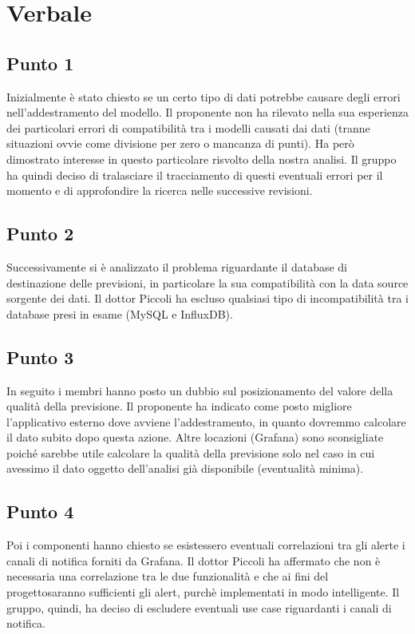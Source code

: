 \section{Verbale}
    \subsection{Punto 1}
        Inizialmente è stato chiesto se un certo tipo di dati potrebbe causare degli errori nell'addestramento del modello. Il proponente non ha rilevato nella sua esperienza dei particolari errori di compatibilità tra i modelli causati dai dati (tranne situazioni ovvie come divisione per zero o mancanza di punti). Ha però dimostrato interesse in questo particolare risvolto della nostra analisi. Il gruppo ha quindi deciso di tralasciare il tracciamento di questi eventuali errori per il momento e di approfondire la ricerca nelle successive revisioni.
    \subsection{Punto 2}
        Successivamente si è analizzato il problema riguardante il database di destinazione delle previsioni, in particolare la sua compatibilità con la data source sorgente dei dati. Il dottor Piccoli ha escluso qualsiasi tipo di incompatibilità tra i database presi in esame (MySQL e InfluxDB). 
    \subsection{Punto 3}
        In seguito i membri hanno posto un dubbio sul posizionamento del valore della qualità della previsione. Il proponente ha indicato come posto migliore l'applicativo esterno dove avviene l'addestramento, in quanto dovremmo calcolare il dato subito dopo questa azione. Altre locazioni (Grafana\glo) sono sconsigliate poiché sarebbe utile calcolare la qualità della previsione solo nel caso in cui avessimo il dato oggetto dell'analisi già disponibile (eventualità minima).
    \subsection{Punto 4}
        Poi i componenti hanno chiesto se esistessero eventuali correlazioni tra gli alert\glosp e i canali di notifica forniti da Grafana\glo. Il dottor Piccoli ha affermato che non è necessaria una correlazione tra le due funzionalità e che ai fini del progetto\glosp saranno sufficienti gli alert\glo, purchè implementati in modo intelligente. Il gruppo, quindi, ha deciso di escludere eventuali use case riguardanti i canali di notifica.
